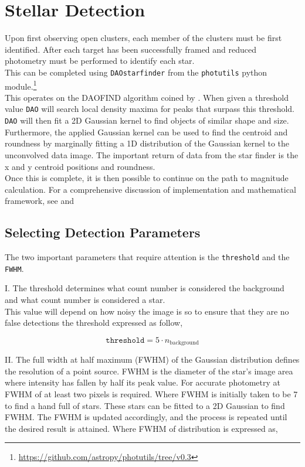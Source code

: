 \section{Stellar Detection} \label{sec: stellar_detect}

Upon first observing open clusters, each member of the clusters must be first identified. After each target has been successfully framed and reduced photometry must be performed to identify each star. \\ This can be completed using \verb|DAOstarfinder| from the \verb|photutils| python module.\footnote{\url{https://github.com/astropy/photutils/tree/v0.3}} \\ This operates on the DAOFIND algorithm coined by \cite{DAO_PHOT}. When given a threshold value \verb|DAO| will search local density maxima for peaks that surpass this threshold. \verb|DAO| will then fit a 2D Gaussian kernel to find objects of similar shape and size. Furthermore, the applied Gaussian kernel can be used to find the centroid and roundness by marginally fitting a 1D distribution of the Gaussian kernel to the unconvolved data image. The important return of data from the star finder is the x and y centroid positions and roundness. \\ Once this is complete, it is then possible to continue on the path to magnitude calculation. For a comprehensive discussion of implementation and mathematical framework, see \cite[Ch. 5.1-5.3]{howell_2006} and \cite{DAO_PHOT}

\subsection{Selecting Detection Parameters}

The two important parameters that require attention is the \verb|threshold| and the \verb|FWHM|. 

I. The threshold determines what count number is considered the background and what count number is considered a star. \\ This value will depend on how noisy the image is so to ensure that they are no false detections the threshold expressed as follow, 

\begin{equation}
    \texttt{threshold} = 5 \cdot n_{\text{background}}
\end{equation}

II. The full width at half maximum (FWHM) of the Gaussian distribution defines the resolution of a point source. FWHM is the diameter of the star's image area where intensity has fallen by half its peak value. For accurate photometry at FWHM of at least two pixels is required. Where FWHM is initially taken to be 7 to find a hand full of stars. These stars can be fitted to a 2D Gaussian to find FWHM. The FWHM is updated accordingly, and the process is repeated until the desired result is attained. Where FWHM of distribution is expressed as, 

